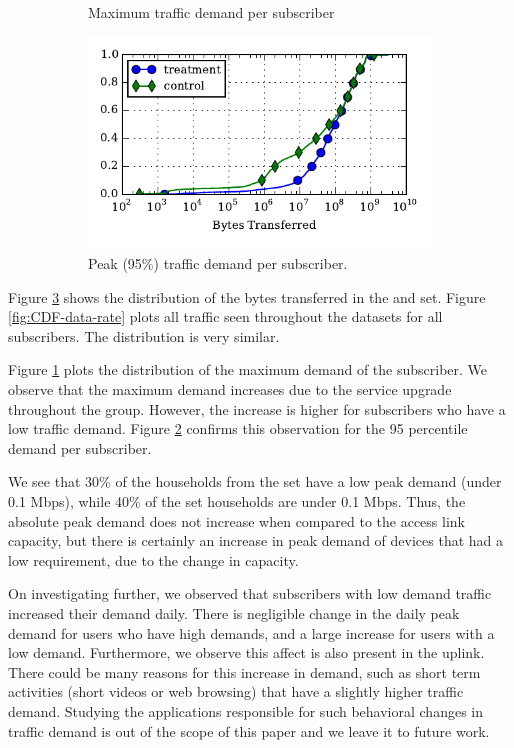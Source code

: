 \begin{figure}[t]
\begin{minipage}{1\linewidth}
\begin{subfigure}[b]{0.33\linewidth}
               \caption{Maximum traffic demand 
per subscriber\label{fig:CDF-data-rate-max}}
\end{subfigure}
%
\begin{subfigure}[b]{0.33\linewidth}
\includegraphics[width=\linewidth]{figures/cdf-per-device-perc95.pdf}
               \caption{Peak (95\%)
traffic demand per subscriber.\label{fig:CDF-data-rate-perc95}}
\end{subfigure}
%
\end{minipage}
\caption{\label{fig:traffic-demand-cdf}}
\end{figure}


Figure \ref{fig:traffic-demand-cdf} shows the distribution of the
bytes transferred in the \treatment{} and \control{} set. Figure 
\ref{fig:CDF-data-rate}
plots all traffic seen throughout the datasets for all subscribers. The
distribution is very similar.

Figure \ref{fig:CDF-data-rate-max} plots the distribution of the
maximum demand of the subscriber. We observe that the maximum demand increases 
due 
to the service upgrade throughout the \control{} group. However, the increase is 
higher for
subscribers who have a low traffic demand. Figure \ref{fig:CDF-data-rate-perc95} 
confirms this
observation for the 95 percentile demand per subscriber.

We see that 30\% of the households from the \test set have a low 
peak demand (under 0.1 Mbps), while 40\% of the \control set households 
are under 0.1 Mbps. Thus, the absolute peak demand does not increase when 
compared to the access link capacity, but there is certainly an increase in 
peak demand of devices that had a low requirement, due to the change in 
capacity.

On investigating further, we observed that subscribers with low demand traffic 
increased their demand daily. There is negligible change in the daily peak 
demand for users
who have high demands, and a large increase for users with a low demand.
Furthermore, we observe this affect is also present in the uplink.
There could be many reasons for this increase in 
demand, such as short term activities (short videos or web browsing) 
that have a slightly higher traffic demand. Studying the applications 
responsible for such behavioral changes in traffic demand is out of the
scope of this paper and we leave it to future work.